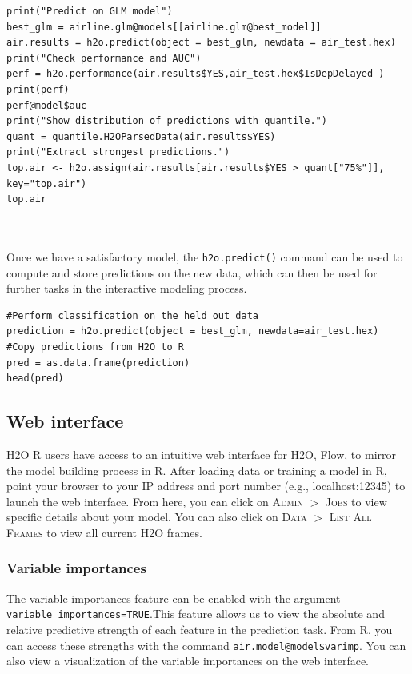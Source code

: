 \documentclass{article}[11pt]
\begin{document}
\begin{lstlisting}[breaklines,basicstyle=\ttfamily]
print("Predict on GLM model")
best_glm = airline.glm@models[[airline.glm@best_model]]
air.results = h2o.predict(object = best_glm, newdata = air_test.hex)
print("Check performance and AUC")
perf = h2o.performance(air.results$YES,air_test.hex$IsDepDelayed )
print(perf)
perf@model$auc
print("Show distribution of predictions with quantile.")
quant = quantile.H2OParsedData(air.results$YES)
print("Extract strongest predictions.")
top.air <- h2o.assign(air.results[air.results$YES > quant["75%"]], key="top.air")
top.air
\end{lstlisting}
\noindent
\\
\\
Once we have a satisfactory model, the \texttt{h2o.predict()} command can be used to compute and store predictions on the new data, which can then be used for further tasks in the interactive modeling process.
\begin{lstlisting}[breaklines,basicstyle=\ttfamily]
#Perform classification on the held out data
prediction = h2o.predict(object = best_glm, newdata=air_test.hex)
#Copy predictions from H2O to R
pred = as.data.frame(prediction)
head(pred)
\end{lstlisting}

\subsection{Web interface} \label{3.3}
H2O R users have access to an intuitive web interface for H2O, Flow, to mirror the model building process in R. After loading data or training a model in R, point your browser to your IP address and port number (e.g., localhost:12345) to launch the web interface. From here, you can click on \textsc{Admin} $>$ \textsc{Jobs} to view specific details about your model. You can also click on \textsc{Data} $>$ \textsc{List All Frames} to view all current H2O frames. 

\subsubsection{Variable importances} \label{3.3.1}
The variable importances feature can be enabled with the argument \texttt{variable\_importances=TRUE}.This feature allows us to view the absolute and relative predictive strength of each feature in the prediction task. From R, you can access these strengths with the command \texttt{air.model@model\$varimp}. You can also view a visualization of the variable
importances on the web interface.
\end{document}
